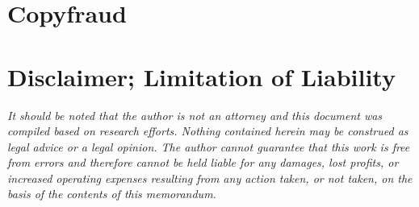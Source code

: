 \documentclass[letterpaper,11pt]{texMemo}
\begin{document}
\section*{Copyfraud}


\section*{Disclaimer; Limitation of Liability}
\emph{It should be noted that the author is not an attorney and this document was compiled based on research efforts. Nothing contained herein may be construed as legal advice or a legal opinion. The author cannot guarantee that this work is free from errors and therefore cannot be held liable for any damages, lost profits, or increased operating expenses resulting from any action taken, or not taken, on the basis of the contents of this memorandum.}
\begingroup
\raggedright

\endgroup
\end{document}

